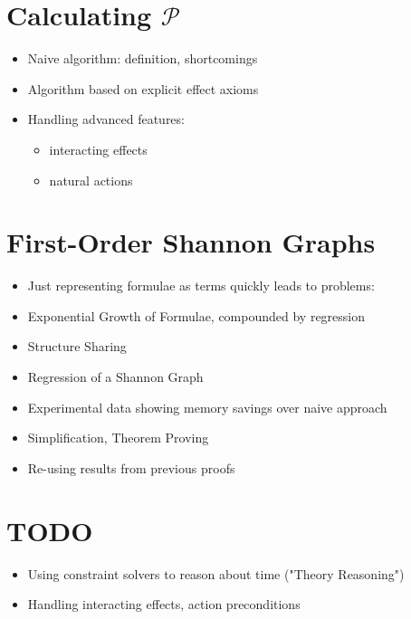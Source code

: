 \section{Calculating $\mathcal{P}$}

\begin{itemize}
\item Naive algorithm: definition, shortcomings
\item Algorithm based on explicit effect axioms
\item Handling advanced features:
  \begin{itemize}
  \item interacting effects
  \item natural actions
  \end{itemize}
\end{itemize}

\section{First-Order Shannon Graphs}

\begin{itemize}
\item Just representing formulae as terms quickly leads to problems:
\item Exponential Growth of Formulae, compounded by regression
\item Structure Sharing
\item Regression of a Shannon Graph
\item Experimental data showing memory savings over naive approach
\item Simplification, Theorem Proving
\item Re-using results from previous proofs
\end{itemize}

\section{TODO}
\begin{itemize}
\item Using constraint solvers to reason about time ("Theory Reasoning")
\item Handling interacting effects, action preconditions
\end{itemize}

